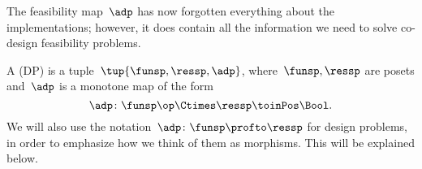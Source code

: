 The feasibility map~$\adp$ has now forgotten everything about the implementations; however, it does contain all the information we need to solve co-design feasibility problems.

\begin{definition}
    \label{def:design-problem}
    A  (DP) is a tuple~$\tup{\funsp, \ressp, \adp}$, where~$\funsp, \ressp$ are posets and~$\adp$ is a monotone map of the form%
    \begin{equation}
        \label{eq:design_prob_as_monfun}
        \adp \colon  \funsp\op \Ctimes \ressp \toinPos \Bool.
    \end{equation}
    We will also use the notation~$\adp \colon \funsp \profto \ressp$ for design problems, in order to emphasize how we think of them as morphisms.
    This will be explained below.
\end{definition}

